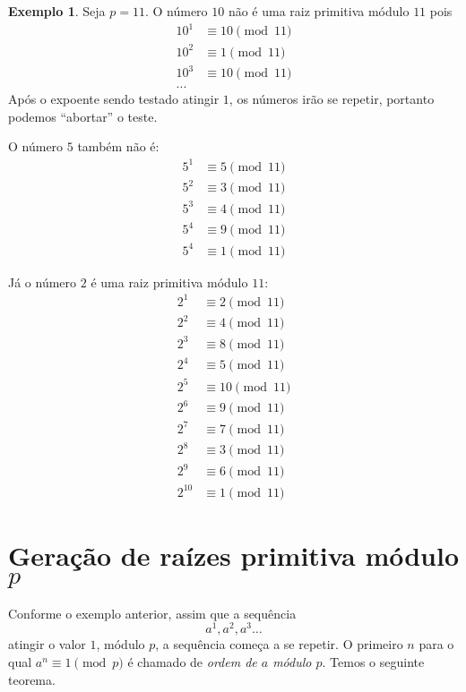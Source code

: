 \documentclass{article}
\theoremstyle{definition}
\newtheorem{example}{Exemplo}
\begin{document}
\begin{example}
    Seja $p = 11$.
    O número $10$ não é uma raiz primitiva módulo $11$ pois
    \begin{align*}
        10^1 &\equiv 10 \pmod{11} \\
        10^2 &\equiv 1 \pmod{11} \\
        10^3 &\equiv 10 \pmod{11} \\
        ...
    \end{align*}
    Após o expoente sendo testado atingir $1$,
    os números irão se repetir,
    portanto podemos ``abortar'' o teste.

    O número $5$ também não é:
    \begin{align*}
        5^1 &\equiv 5 \pmod{11} \\
        5^2 &\equiv 3 \pmod{11} \\
        5^3 &\equiv 4 \pmod{11} \\
        5^4 &\equiv 9 \pmod{11} \\
        5^4 &\equiv 1 \pmod{11}
    \end{align*}

    Já o número $2$ é uma raiz primitiva módulo $11$:
    \begin{align*}
        2^1 &\equiv 2 \pmod{11} \\
        2^2 &\equiv 4 \pmod{11} \\
        2^3 &\equiv 8 \pmod{11} \\
        2^4 &\equiv 5 \pmod{11} \\
        2^5 &\equiv 10 \pmod{11} \\
        2^6 &\equiv 9 \pmod{11} \\
        2^7 &\equiv 7 \pmod{11} \\
        2^8 &\equiv 3 \pmod{11} \\
        2^9 &\equiv 6 \pmod{11} \\
        2^{10} &\equiv 1 \pmod{11}
    \end{align*}
\end{example}

\section{Geração de raízes primitiva módulo $p$}

Conforme o exemplo anterior,
assim que a sequência
\begin{equation*}
    a^1, a^2, a^3 \ldots
\end{equation*}
atingir o valor $1$, módulo $p$,
a sequência começa a se repetir.
O primeiro $n$ para o qual $a^n \equiv 1 \pmod p$
é chamado de \emph{ordem de $a$ módulo $p$}.
Temos o seguinte teorema.
\end{document}
